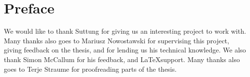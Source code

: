 \chapter*{Preface} %
\label{chap:preface}
We would like to thank Suttung for giving us an interesting project to work
with. Many thanks also goes to Mariusz Nowostawski for supervising this project,
giving feedback on the thesis, and for lending us his technical knowledge.
We also thank Simon McCallum for his feedback, and \LaTeX support.
Many thanks also goes to Terje Straume for proofreading parts of the thesis.
